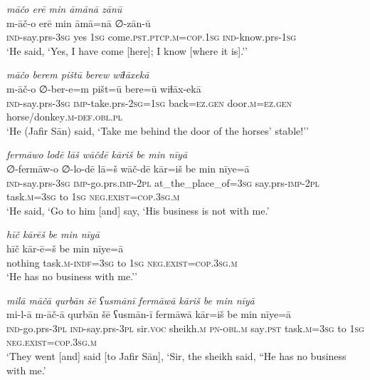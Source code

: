 \ea \label{ŠJ.61}
\textit{māčo erē min āmānā zānū} \\ 
\gll m-āč-o erē min āmā=nā ∅-zān-ū \\ 
 \textsc{ind-}say.prs\textsc{-3sg} yes \textsc{1sg} come\textsc{.pst}\textsc{.ptcp}\textsc{.m}\textsc{=cop}\textsc{.\textsc{1sg}} \textsc{ind-}know.prs\textsc{-\textsc{1sg}} \\ 
\glt `He said, ‘Yes, I have come [here]; I know [where it is].’'
\z 
 
\ea \label{ŠJ.62}
\textit{māčo berem pištū berew wiɫāxekā} \\ 
\gll m-āč-o ∅-ber-e=m pišt=ū bere=ū wiɫāx-ekā \\ 
 \textsc{ind-}say.prs\textsc{-3sg} \textsc{imp-}take.prs-\textsc{2sg}\textsc{=\textsc{1sg}} back\textsc{=ez.gen} door\textsc{.m}\textsc{=ez.gen} horse/donkey\textsc{.m}\textsc{-def}\textsc{.obl}\textsc{.pl} \\ 
\glt `He (Jafir Sān) said, ‘Take me behind the door of the horses’ stable!’'
\z 
 
\ea \label{ŠJ.74}
\textit{fermāwo lodē lāš wāčdē kāriš be min nīyā} \\ 
\gll ∅-fermāw-o ∅-lo-dē lā=š wāč-dē kār=iš be min nīye=ā \\ 
 \textsc{ind-}say.prs\textsc{-3sg} \textsc{imp-}go.prs.\textsc{imp-}\textsc{2pl} at\_the\_place\_of\textsc{=3sg} say.prs-\textsc{imp-}\textsc{2pl} task\textsc{.m}\textsc{=3sg} to \textsc{1sg} \textsc{\textsc{neg.}exist}\textsc{=cop}\textsc{.3sg}\textsc{.m} \\ 
\glt `He said, ‘Go to him [and] say, ‘His business is not with me.'
\z 
 
\ea \label{ŠJ.76}
\textit{hīč kārēš be min nīyā} \\ 
\gll hīč kār-ē=š be min nīye=ā \\ 
 nothing task\textsc{.m}\textsc{-indf}\textsc{=3sg} to \textsc{1sg} \textsc{\textsc{neg.}exist}\textsc{=cop}\textsc{.3sg}\textsc{.m} \\ 
\glt `He has no business with me.’'
\z 
 
\ea \label{ŠJ.77}
\textit{milā māčā qurbān šē ʕusmānī fermāwā kāriš be min nīyā} \\ 
\gll mi-l-ā m-āč-ā qurbān šē ʕusmān-ī fermāwā kār=iš be min nīye=ā \\ 
 \textsc{ind-}go.prs\textsc{-3pl} \textsc{ind-}say.prs\textsc{-3pl} sir.\textsc{voc} sheikh\textsc{.m} \textsc{pn}\textsc{-obl}\textsc{.m} say\textsc{.pst} task\textsc{.m}\textsc{=3sg} to \textsc{1sg} \textsc{\textsc{neg.}exist}\textsc{=cop}\textsc{.3sg}\textsc{.m} \\ 
\glt `They went [and] said [to Jafir Sān], ‘Sir, the sheikh said, “He has no business with me.'
\z 
 
